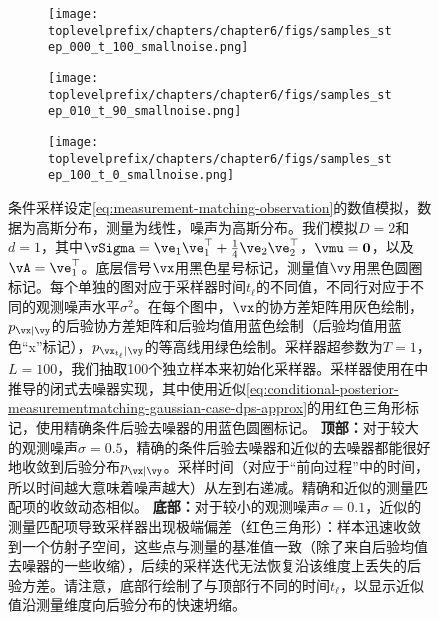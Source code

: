 \documentclass[../../book-main_zh.tex]{subfiles}
\begin{document}
\begin{example}
\begin{figure}[tbp]
    \vspace{2mm} %

    \begin{subfigure}{0.32\textwidth}
      \texttt{[image: \\toplevelprefix/chapters/chapter6/figs/samples\_step\_000\_t\_100\_smallnoise.png]}
    \end{subfigure}
    \hfill
    \begin{subfigure}{0.32\textwidth}
      \texttt{[image: \\toplevelprefix/chapters/chapter6/figs/samples\_step\_010\_t\_90\_smallnoise.png]}
    \end{subfigure}
    \hfill
    \begin{subfigure}{0.32\textwidth}
      \texttt{[image: \\toplevelprefix/chapters/chapter6/figs/samples\_step\_100\_t\_0\_smallnoise.png]}
    \end{subfigure}

    \caption{条件采样设定\eqref{eq:measurement-matching-observation}的数值模拟，数据为高斯分布，测量为线性，噪声为高斯分布。我们模拟$D=2$和$d=1$，其中$\vSigma = \ve_1 \ve_1^\top + \tfrac{1}{4} \ve_2 \ve_2^\top$，$\vmu = \Zero$，以及$\vA = \ve_1^\top$。底层信号$\vx$用黑色星号标记，测量值$\vy$用黑色圆圈标记。每个单独的图对应于采样器时间$t_{\ell}$的不同值，不同行对应于不同的观测噪声水平$\sigma^2$。在每个图中，$\vx$的协方差矩阵用灰色绘制，$p_{\vx \mid \vy}$的后验协方差矩阵和后验均值用蓝色绘制（后验均值用蓝色“x”标记），$p_{\vx_{t_{\ell}} \mid \vy}$的等高线用绿色绘制。采样器超参数为$T=1$，$L=100$，我们抽取100个独立样本来初始化采样器。采样器使用在中推导的闭式去噪器实现，其中使用近似\eqref{eq:conditional-posterior-measurementmatching-gaussian-case-dps-approx}的用红色三角形标记，使用精确条件后验去噪器的用蓝色圆圈标记。
    \textbf{顶部：}对于较大的观测噪声$\sigma = 0.5$，精确的条件后验去噪器和近似的去噪器都能很好地收敛到后验分布$p_{\vx \mid \vy}$。采样时间（对应于“前向过程”中的时间，所以时间越大意味着噪声越大）从左到右递减。精确和近似的测量匹配项的收敛动态相似。
    \textbf{底部：}对于较小的观测噪声$\sigma = 0.1$，近似的测量匹配项导致采样器出现极端偏差（红色三角形）：样本迅速收敛到一个仿射子空间，这些点与测量的基准值一致（除了来自后验均值去噪器的一些收缩），后续的采样迭代无法恢复沿该维度上丢失的后验方差。请注意，底部行绘制了与顶部行不同的时间$t_{\ell}$，以显示近似值沿测量维度向后验分布的快速坍缩。}
    \label{fig:conditional_sampling_computational_gaussian}
  \end{figure}


\end{example}
\end{document}
